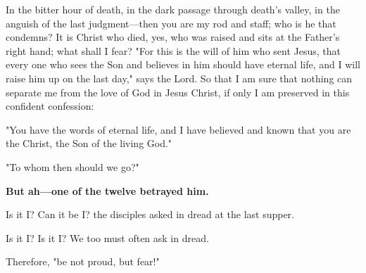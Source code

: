 In the bitter hour of death, in the dark passage through death’s valley, in the anguish of the last judgment—then you are my rod and staff; who is he that condemns? It is Christ who died, yes, who was raised and sits at the Father’s right hand; what shall I fear? "For this is the will of him who sent Jesus, that every one who sees the Son and believes in him should have eternal life, and I will raise him up on the last day," says the Lord. So that I am sure that nothing can separate me from the love of God in Jesus Christ, if only I am preserved in this confident confession:

"You have the words of eternal life, and I have believed and known that you are the Christ, the Son of the living God."

"To whom then should we go?"

\textbf{But ah—one of the twelve betrayed him.}

Is it I? Can it be I? the disciples asked in dread at the last supper.

Is it I? Is it I? We too must often ask in dread.

Therefore, "be not proud, but fear!"

